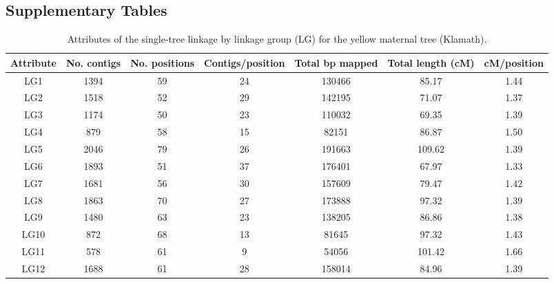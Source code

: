 \documentclass[smallextended]{svjour3}
\begin{document}
\begin{landscape}

\subsection*{Supplementary Tables}\label{ss:supp}

  
\begin{table}[ht]
  \caption{Attributes of the single-tree linkage by linkage group (LG) for the yellow maternal tree (Klamath).}
\begin{tabular}{ccccccc}
\toprule
Attribute & No. contigs & No. positions & Contigs/position & Total bp mapped & Total length (cM) & cM/position \\
\midrule
LG1 & 1394 & 59 & 24 & 130466 & 85.17 & 1.44 \\
LG2 & 1518 & 52 & 29 & 142195 & 71.07 & 1.37 \\
LG3 & 1174 & 50 & 23 & 110032 & 69.35 & 1.39 \\
LG4 & 879 & 58 & 15 & 82151 & 86.87 & 1.50 \\
LG5 & 2046 & 79 & 26 & 191663 & 109.62 & 1.39 \\
LG6 & 1893 & 51 & 37 & 176401 & 67.97 & 1.33 \\
LG7 & 1681 & 56 & 30 & 157609 & 79.47 & 1.42 \\
LG8 & 1863 & 70 & 27 & 173888 & 97.32 & 1.39 \\
LG9 & 1480 & 63 & 23 & 138205 & 86.86 & 1.38 \\
LG10 & 872 & 68 & 13 & 81645 & 97.32 & 1.43 \\
LG11 & 578 & 61 & 9 & 54056 & 101.42 & 1.66 \\
LG12 & 1688 & 61 & 28 & 158014 & 84.96 & 1.39 \\
\bottomrule
\end{tabular} 
\label{t:label}
\end{table}
\end{landscape}
\end{document}
